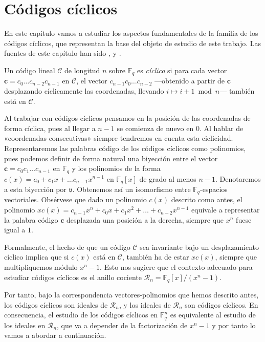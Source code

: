 
\chapter{Códigos cíclicos}

En este capítulo vamos a estudiar los aspectos fundamentales de la familia de los códigos cíclicos, que representan la base del objeto de estudio de este trabajo.
Las fuentes de este capítulo han sido \parencite{huffman_fundamentals_2003}, \parencite{kelbert_information_2013} y \parencite{macwilliams_theory_1977}.

\begin{definition}
  Un código lineal \(\mathcal C\) de longitud \(n\) sobre \(\mathbb F_q\) es \textit{cíclico} si para cada vector \(\mathbf c = c_0\dots c_{n-2}c_{n-1}\) en \(\mathcal C\), el vector \(c_{n-1}c_0\dots c_{n-2}\) —obtenido a partir de \(\mathbf c\) desplazando cíclicamente las coordenadas, llevando \(i \mapsto i +1 \bmod n\)— también está en \(\mathcal C\).
\end{definition}

Al trabajar con códigos cíclicos pensamos en la posición de las coordenadas de forma cíclica, pues al llegar a \(n -1\) se comienza de nuevo en \(0\).
Al hablar de «coordenadas consecutivas» siempre tendremos en cuenta esta ciclicidad.
Representaremos las palabras código de los códigos cíclicos como polinomios, pues podemos definir de forma natural una biyección entre el vector \(\mathbf c = c_0c_1\dots c_{n-1}\) en \(\mathbb F_q\) y los polinomios de la forma \(c(x) = c_0 + c_1x + \dots c_{n-1}x^{n-1}\) en \(\mathbb F_q[x]\) de grado al menos \(n-1\).
Denotaremos a esta biyección por \(\mathfrak v\).
Obtenemos así un isomorfismo entre \(\mathbb F_q\)-espacios vectoriales.
Obsérvese que dado un polinomio \(c(x)\) descrito como antes, el polinomio \(xc(x) = c_{n-1}x^n + c_0x + c_1x^2 + \dots + c_{n-2}x^{n-1}\) equivale a representar la palabra código \(\mathbf c\) desplazada una posición a la derecha, siempre que \(x^n\) fuese igual a \(1\).

Formalmente, el hecho de que un código \(\mathcal C\) sea invariante bajo un desplazamiento cíclico implica que si \(c(x)\) está en \(\mathcal C\), también ha de estar \(xc(x)\), siempre que multipliquemos módulo \(x^n -1\). 
Esto nos sugiere que el contexto adecuado para estudiar códigos cíclicos es el anillo cociente \(\mathcal R_n = \mathbb F_q[x]/(x^n - 1)\).

Por tanto, bajo la correspondencia vectores-polinomios que hemos descrito antes, los códigos cíclicos son ideales de \(\mathcal R_n\), y los ideales de \(\mathcal R_n\) son códigos cíclicos.
En consecuencia, el estudio de los códigos cíclicos en \(\mathbb F_q^n\) es equivalente al estudio de los ideales en \(\mathcal R_n\), que va a depender de la factorización de \(x^n-1\) y por tanto lo vamos a abordar a continuación.

